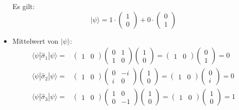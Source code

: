 \documentclass[11pt, ngerman, fleqn, DIV=15, headinclude]{scrartcl}
\begin{document}
\begin{itemize}
	Es gilt:
	\begin{equation*}
		|\psi\rangle=
		1\cdot\begin{pmatrix}1\\0\end{pmatrix}+0\cdot\begin{pmatrix}0\\1\end{pmatrix}
	\end{equation*}

	\item Mittelwert von $|\psi\rangle$:
	\begin{align*}
		\langle\psi|\hat{\sigma}_1|\psi\rangle=
			&\begin{pmatrix}1&0\end{pmatrix}	 \begin{pmatrix}0&1\\1&0\end{pmatrix} \begin{pmatrix}1\\0\end{pmatrix}
			=\begin{pmatrix}1&0\end{pmatrix}\begin{pmatrix}0\\1\end{pmatrix}=0\\
		\langle\psi|\hat{\sigma}_2|\psi\rangle=&
			\begin{pmatrix}1&0\end{pmatrix}	 \begin{pmatrix}0&-i\\i&0\end{pmatrix} \begin{pmatrix}1\\0\end{pmatrix}=\begin{pmatrix}1&0\end{pmatrix}\begin{pmatrix}0\\i\end{pmatrix}=0\\
		\langle\psi|\hat{\sigma}_3|\psi\rangle=&
			\begin{pmatrix}1&0\end{pmatrix}	 \begin{pmatrix}1&0\\0&-1\end{pmatrix} \begin{pmatrix}1\\0\end{pmatrix}=\begin{pmatrix}1&0\end{pmatrix}\begin{pmatrix}1\\0\end{pmatrix}=1
	\end{align*}

\end{itemize}
\end{document}
